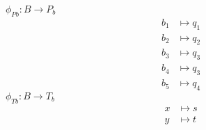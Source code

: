 \documentclass[a4paper]{scrartcl}
\begin{document}
\begin{enumerate}
        $\phi_{Pb} \colon B \to P_b$
        \begin{equation}
            \begin{split}
                b_1 &\mapsto q_1 \\
                b_2 &\mapsto q_2 \\
                b_3 &\mapsto q_3 \\
                b_4 &\mapsto q_3 \\
                b_5 &\mapsto q_4
            \end{split}
        \end{equation}
        $\phi_{Tb} \colon B \to T_b$
        \begin{equation}
            \begin{split}
                x &\mapsto s \\
                y &\mapsto t
            \end{split}
        \end{equation}
        

\end{enumerate}
\end{document}
